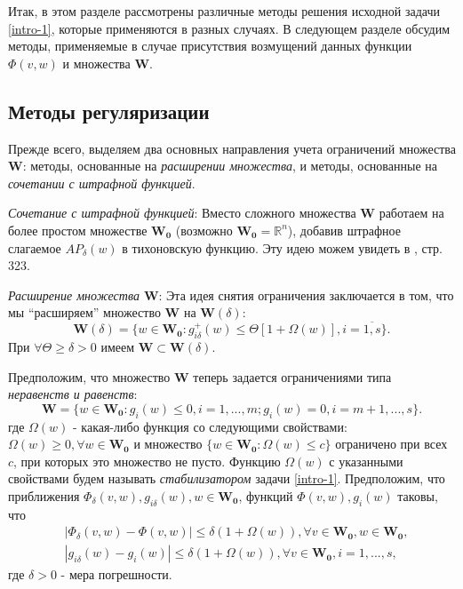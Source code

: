 Итак, в этом разделе рассмотрены различные методы решения исходной задачи \eqref{intro-1}, которые применяются в разных случаях. В следующем разделе обсудим методы, применяемые в случае присутствия возмущений данных функции $\Phi(v,w)$ и множества $\mathbf{W}$. 
\subsection{Методы регуляризации}
Прежде всего, выделяем два основных направления учета ограничений множества $\mathbf{W}$: методы, основанные на \textit{расширении множества}, и методы, основанные на \textit{сочетании с штрафной функцией}. 

\emph{Сочетание с штрафной функцией}:
Вместо сложного множества $\mathbf{W}$ работаем на более простом множестве $\mathbf{W_0}$ (возможно $\mathbf{W_0}=\mathbb{R}^n$), добавив штрафное слагаемое $AP_{\delta}(w)$ в тихоновскую функцию. Эту идею можем увидеть в \cite{5}, стр. 323.

\emph{Расширение множества $\mathbf{W}$}:
Эта идея снятия ограничения заключается в том, что мы ``расширяем'' множество $\mathbf{W}$ на $\mathbf{W}(\delta)$:
\begin{equation*}
\mathbf{W}(\delta)=\{w\in \mathbf{W_0}:g_{i\delta}^+(w)\leqslant\Theta[1+\Omega(w)],i=\overline{1,s}\}.
\end{equation*}
При $\forall \Theta\geqslant\delta>0$ имеем $\mathbf{W}\subset \mathbf{W}(\delta).$

Предположим, что множество $\mathbf{W}$ теперь задается ограничениями типа \textit{неравенств и равенств}:
\begin{equation*}
\mathbf{W}=\{w\in\mathbf{W_0} :g_i(w)\leqslant 0,i=1,...,m;g_i(w)=0,i=m+1,...,s\}.
\end{equation*}
где $\Omega(w)$ - какая-либо функция со следующими свойствами: $\Omega(w)\geqslant 0,\forall w\in\mathbf{W_0}$ и множество $\{w\in\mathbf{W_0}:\Omega(w)\leqslant c \}$ ограничено при всех $c$, при которых это множество не пусто. Функцию $\Omega(w)$
с указанными свойствами будем называть \textit{стабилизатором} задачи \eqref{intro-1}. Предположим, что приближения $\Phi_{\delta}(v, w), g_{i\delta}(w), w \in\mathbf{W_0}$, функций $\Phi( v, w), g_i(w)$ таковы, что
\begin{equation}
\label{noiiise}
\begin{aligned}
&|\Phi_{\delta}(v,w)-\Phi(v,w)|\leqslant \delta(1+\Omega(w)),\forall v\in \mathbf{W_0},w\in\mathbf{W_0},\\
&|g_{i\delta}(w)-g_{i}(w)|\leqslant \delta(1+\Omega(w)),\forall v\in \mathbf{W_0},i=1,...,s,
\end{aligned}
\end{equation}
где $\delta > 0$ - мера погрешности.

